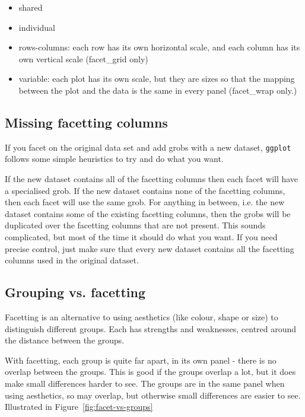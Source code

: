 \begin{itemize}
  \item shared
  \item individual
  \item rows-columns: each row has its own horizontal scale, and each column has its own vertical scale (facet\_grid only)
  \item variable: each plot has its own scale, but they are sizes so that the mapping between the plot and the data is the same in every panel (facet\_wrap only.)
\end{itemize}



\subsection{Missing facetting columns}\label{sub:missing_facetting_columns}

If you facet on the original data set and add grobs with a new dataset, {\tt ggplot} follows some simple heuristics to try and do what you want.  

If the new dataset contains all of the facetting columns then each facet will have a specialised grob. If the new dataset contains none of the facetting columns, then each facet will use the same grob.  For anything in between, i.e. the new dataset contains some of the existing facetting columns, then the grobs will be duplicated over the facetting columns that are not present.  This sounds complicated, but most of the time it should do what you want.  If you need precise control, just make sure that every new dataset contains all the facetting columns used in the original dataset.



\subsection{Grouping vs. facetting}
\label{sub:group-vs-facet}

Facetting is an alternative to using aesthetics (like colour, shape or size) to distinguish different groups.  Each has strengths and weaknesses, centred around the distance between the groups.

With facetting, each group is quite far apart, in its own panel - there is no overlap between the groups.  This is good if the groups overlap a lot, but it does make small differences harder to see.  The groups are in the same panel when using aesthetics, so may overlap, but otherwise small differences are easier to see.  Illustrated in Figure~\ref{fig:facet-vs-groups}


